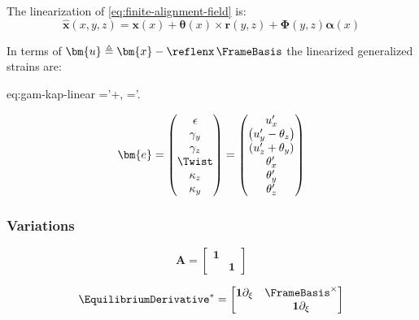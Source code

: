 

The linearization of \eqref{eq:finite-alignment-field} is:
\begin{equation*}
\hat{\bm{x}}(x,y,z)=\bm{x}(x)+\bm{\theta}(x) \times \bm{r}(y,z)
+\bm{\Phi}(y,z)\bm{\alpha}(x)
\end{equation*}

In terms of \(\bm{u}\triangleq\bm{x}- \reflenx\,\FrameBasis\) the linearized generalized strains are:
\begin{SaveEquation}{eq:gam-kap-linear}
\bm{\gamma}='+\FrameBasis\times\bm\theta,\qquad
\bm{\kappa}=\bm\theta'.
\end{SaveEquation}

\begin{equation}
\bm{e}= 
\begin{pmatrix}
\epsilon \\ 
\gamma_y \\
\gamma_z \\
\Twist \\
\kappa_z \\ 
\kappa_y \\ 
\end{pmatrix} =
\begin{pmatrix}
u_x^{\prime} \\ 
\left(u_y^{\prime}-\theta_z\right) \\ 
\left(u_z^{\prime}+\theta_y\right) \\
\theta_x^{\prime} \\ 
\theta_y^{\prime} \\
\theta_z^{\prime} \\
\end{pmatrix}
\end{equation}

\subsubsection{Variations}

$$
\bm{A} = \begin{bmatrix}
\mathbf{1} & \\
& \mathbf{1}
\end{bmatrix}
$$

\begin{equation}
\EquilibriumDerivative^* = \begin{bmatrix}
\mathbf{1} \partial_{\xi} & \FrameBasis^\times  \\
& \mathbf{1} \partial_{\xi}  \\
\end{bmatrix}
\end{equation}

